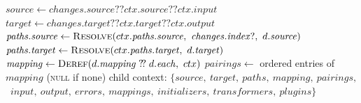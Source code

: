 \documentclass[varwidth=150mm,border=6pt]{standalone}
\begin{document}
\begin{algorithmic}[1]
  \State $\mathit{source} \gets \mathit{changes.source} \mathrel{?\!?} ctx.\mathit{source} \mathrel{?\!?} ctx.\mathit{input}$
  \State $\mathit{target} \gets \mathit{changes.target} \mathrel{?\!?} ctx.\mathit{target} \mathrel{?\!?} ctx.\mathit{output}$
   
    \State $\mathit{paths.source} \gets \textsc{Resolve}(ctx.\mathit{paths.source},\ \mathit{changes.index}?,\ d.\mathit{source})$
  \EndIf
    \State $\mathit{paths.target} \gets \textsc{Resolve}(ctx.\mathit{paths.target},\ d.\mathit{target})$
  \EndIf
  \State $\mathit{mapping} \gets \textsc{Deref}(d.\mathit{mapping} \mathrel{?\!?} d.\mathit{each},\ ctx)$
  \State $\mathit{pairings} \gets$ ordered entries of $\mathit{mapping}$ (\textsc{null} if none)
  \State \Return child context: 
  \State \quad $\{\mathit{source},\ \mathit{target},\ \mathit{paths},\ \mathit{mapping},\ \mathit{pairings},$
  \State \quad\ $\mathit{input},\ \mathit{output},\ \mathit{errors},\ \mathit{mappings},\ \mathit{initializers},\ \mathit{transformers},\ \mathit{plugins}\}$
\EndFunction
\end{algorithmic}
\end{document}
